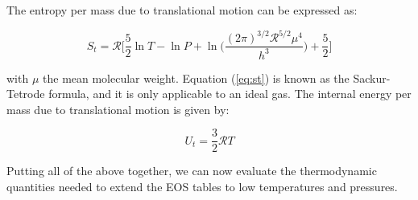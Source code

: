 \documentclass[apj]{emulateapj}
\begin{document}
The entropy per mass due to translational motion can be expressed as:

\begin{equation}
\label{eq:st}
S_t=\mathcal{R} \Big[ \frac{5}{2} \ln{T} - \ln{P} + \ln \Big( \frac{(2 \pi)^{3/2} \mathcal{R}^{5/2} \mu^4}{h^3}\Big) +\frac{5}{2} \Big]
\end{equation}

\noindent with $\mu$ the mean molecular weight. Equation (\ref{eq:st}) is known as the Sackur-Tetrode formula, and it is only applicable to an ideal gas. The internal energy per mass due to translational motion is given by:

\begin{equation}
\label{eq:ut}
U_t=\frac{3}{2} \mathcal{R} T
\end{equation}

Putting all of the above together, we can now evaluate the thermodynamic quantities needed to extend the \cite{saumon95} EOS tables to low temperatures and pressures.
\end{document}
